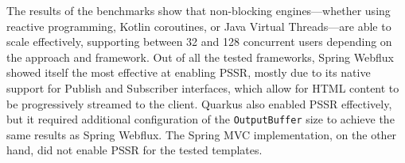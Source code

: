 The results of the benchmarks show that non-blocking engines—whether using
reactive programming, Kotlin coroutines, or Java Virtual Threads—are able to
scale effectively, supporting between 32 and 128 concurrent users depending on
the approach and framework. Out of all the tested frameworks, Spring Webflux
showed itself the most effective at enabling PSSR, mostly due to its native
support for Publish and Subscriber interfaces, which allow for HTML content to
be progressively streamed to the client. Quarkus also enabled PSSR effectively,
but it required additional configuration of the \texttt{OutputBuffer} size to
achieve the same results as Spring Webflux. The Spring MVC implementation, on
the other hand, did not enable PSSR for the tested templates.

